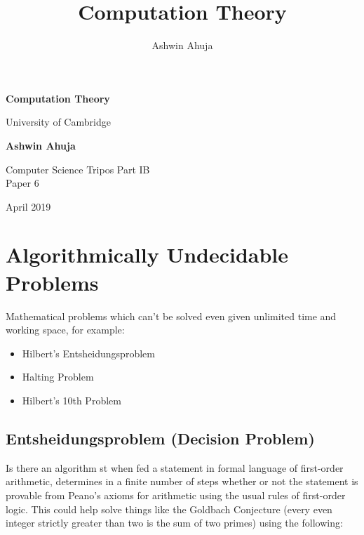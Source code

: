 \documentclass{article}
\title{Computation Theory}
\author{Ashwin Ahuja}
\newenvironment{definition}{\par\color{blue}}{\par}
\begin{document}
\makeatletter
\renewcommand{\l@subsection}{\@dottedtocline{2}{1.6em}{2.6em}}
\makeatother

\begin{titlepage}
\begin{center}
			\vspace*{1cm}
			
			\Huge
			\textbf{Computation Theory}
			
			\vspace{0.5cm}
			\LARGE
			University of Cambridge
			
			\vspace{1.5cm}
			
			\textbf{Ashwin Ahuja}
			
			\vfill
			
			Computer Science Tripos Part IB\\
			Paper 6
			
			\vspace{5cm}
			
			April 2019
			
\end{center}
\end{titlepage}

\tableofcontents
\pagebreak

\section{Algorithmically Undecidable Problems}
\begin{definition}
Mathematical problems which can't be solved even given unlimited time and working space, for example:
\end{definition}
\begin{itemize}
    \item Hilbert's Entsheidungsproblem
    \item Halting Problem
    \item Hilbert's 10th Problem
\end{itemize}

\subsection{Entsheidungsproblem (Decision Problem)}
\begin{definition}
    Is there an algorithm st when fed a statement in formal language of first-order arithmetic, determines in a finite number of steps whether or not the statement is provable from Peano's axioms for arithmetic using the usual rules of first-order logic. This could help solve things like the Goldbach Conjecture (every even integer strictly greater than two is the sum of two primes) using the following:
\end{definition}
\end{document}
